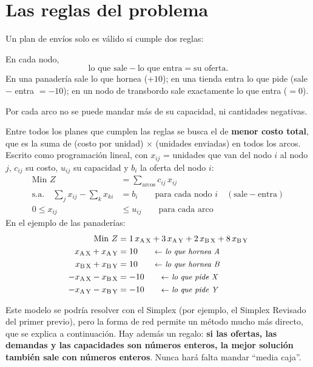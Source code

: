 \documentclass[11pt,a4paper]{article}
\newcommand{\x}[2]{x_{\mathrm{#1}\,\mathrm{#2}}}
\begin{document}
\section{Las reglas del problema}

Un plan de envíos solo es válido si cumple dos reglas:

\begin{description}[leftmargin=0pt, itemsep=5pt]
  \item[Conservación (nada aparece ni desaparece).] En cada nodo,
        \[ \text{lo que sale} - \text{lo que entra} = \text{su oferta}. \]
        En una panadería sale lo que hornea ($+10$); en una tienda entra lo que pide (sale $-$ entra $= -10$);
        en un nodo de transbordo sale exactamente lo que entra ($= 0$).
  \item[Capacidad.] Por cada arco no se puede mandar más de su capacidad, ni cantidades negativas.
\end{description}

Entre todos los planes que cumplen las reglas se busca el de \textbf{menor costo total}, que es la suma de
(costo por unidad) $\times$ (unidades enviadas) en todos los arcos. Escrito como programación lineal, con
$x_{ij}$ = unidades que van del nodo $i$ al nodo $j$, $c_{ij}$ su costo, $u_{ij}$ su capacidad y $b_i$ la oferta del nodo $i$:
\[
\begin{aligned}
\text{Min } Z &= \sum_{\text{arcos}} c_{ij}\, x_{ij}\\
\text{s.a.}\quad \sum_{j} x_{ij} - \sum_{k} x_{ki} &= b_i \qquad \text{para cada nodo } i \quad (\text{sale} - \text{entra})\\
0 \le x_{ij} &\le u_{ij} \qquad \text{para cada arco}
\end{aligned}
\]
En el ejemplo de las panaderías:
\[
\begin{aligned}
\text{Min } Z &= 1\,\x{A}{X} + 3\,\x{A}{Y} + 2\,\x{B}{X} + 8\,\x{B}{Y}\\
\x{A}{X} + \x{A}{Y} &= 10 \nota{lo que hornea A}\\
\x{B}{X} + \x{B}{Y} &= 10 \nota{lo que hornea B}\\
-\x{A}{X} - \x{B}{X} &= -10 \nota{lo que pide X}\\
-\x{A}{Y} - \x{B}{Y} &= -10 \nota{lo que pide Y}
\end{aligned}
\]

Este modelo se podría resolver con el Simplex (por ejemplo, el Simplex Revisado del primer previo), pero la forma
de red permite un método mucho más directo, que se explica a continuación. Hay además un regalo:
\textbf{si las ofertas, las demandas y las capacidades son números enteros, la mejor solución también sale con
números enteros}. Nunca hará falta mandar ``media caja''.
\end{document}
